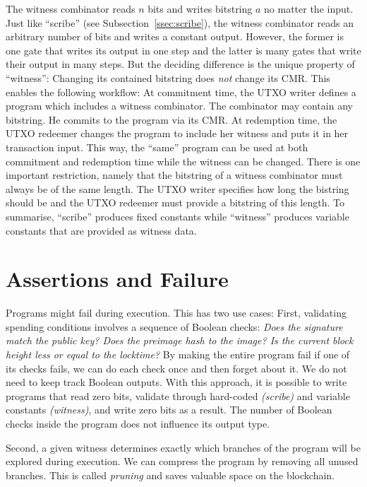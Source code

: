 
%
The witness combinator reads $n$ bits and writes bitstring $a$ no matter the input.
Just like \enquote{scribe} (see Subsection~\ref{ssec:scribe}),
the witness combinator reads an arbitrary number of bits and writes a constant output.
However,
the former is one gate that writes its output in one step
and the latter is many gates that write their output in many steps.
But the deciding difference is the unique property of \enquote{witness}:
Changing its contained bitstring does \emph{not} change its CMR.
This enables the following workflow:
At commitment time,
the UTXO writer defines a program which includes a witness combinator.
The combinator may contain any bitstring.
He commits to the program via its CMR.
At redemption time,
the UTXO redeemer changes the program to include her witness and puts it in her transaction input.
This way,
the \enquote{same} program can be used at both commitment and redemption time
while the witness can be changed.
There is one important restriction,
namely that the bitstring of a witness combinator must always be of the same length.
The UTXO writer specifies how long the bistring should be and the UTXO redeemer must provide a bitstring of this length.
%
To summarise,
\enquote{scribe} produces fixed constants while \enquote{witness} produces variable constants that are provided as witness data.

\section{Assertions and Failure}%
\label{sec:asserts}

Programs might fail during execution.
This has two use cases:
First,
validating spending conditions involves a sequence of Boolean checks:
\emph{Does the signature match the public key?
Does the preimage hash to the image?
Is the current block height less or equal to the locktime?}
By making the entire program fail if one of its checks fails,
we can do each check once and then forget about it.
We do not need to keep track Boolean outputs.
With this approach,
it is possible to write programs that read zero bits,
validate through hard-coded \emph{(scribe)} and variable constants \emph{(witness)},
and write zero bits as a result.
The number of Boolean checks inside the program does not influence its output type.

Second,
a given witness determines exactly which branches of the program will be explored during execution.
We can compress the program by removing all unused branches.
This is called \emph{pruning} and saves valuable space on the blockchain.

